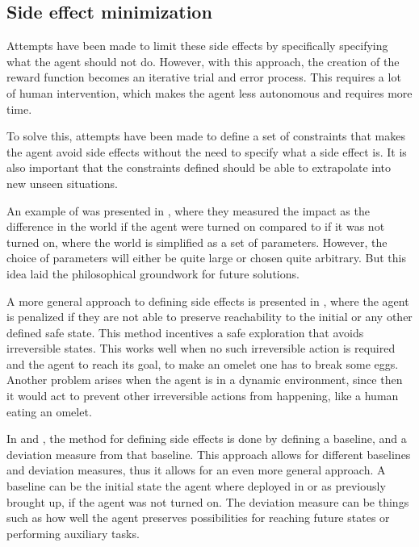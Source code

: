 \documentclass[12pt,A4]{report}
\theoremstyle{definition}
\begin{document}
\subsection{Side effect minimization}
Attempts have been made to limit these side effects by specifically specifying what the agent should not do\autocite{Zhang et al}. However, with this approach, the creation of the reward function becomes an iterative trial and error process. This requires a lot of human intervention, which makes the agent less autonomous and requires more time. 

To solve this, attempts have been made to define a set of constraints that makes the agent avoid side effects without the need to specify what a side effect is. It is also important that the constraints defined should be able to extrapolate into new unseen situations.

An example of was presented in \autocite{Armstrong and Levinstein}, where they measured the impact as the difference in the world if the agent were turned on compared to if it was not turned on, where the world is simplified as a set of parameters. However, the choice of parameters will either be quite large or chosen quite arbitrary. But this idea laid the philosophical groundwork for future solutions.

A more general approach to defining side effects is presented in \autocite{Eysenbach et al}, where the agent is penalized if they are not able to preserve reachability to the initial or any other defined safe state. This method incentives a safe exploration that avoids irreversible states. This works well when no such irreversible action is required and the agent to reach its goal, to make an omelet one has to break some eggs. Another problem arises when the agent is in a dynamic environment, since then it would act to prevent other irreversible actions from happening, like a human eating an omelet. 

In \autocite{Krakovna et al 2019} and \autocite{Turner et al 2020}, the method for defining side effects is done by defining a baseline, and a deviation measure from that baseline. This approach allows for different baselines and deviation measures, thus it allows for an even more general approach. A baseline can be the initial state the agent where deployed in or as previously brought up, if the agent was not turned on. The deviation measure can be things such as how well the agent preserves possibilities for reaching future states or performing auxiliary tasks.
\end{document}
